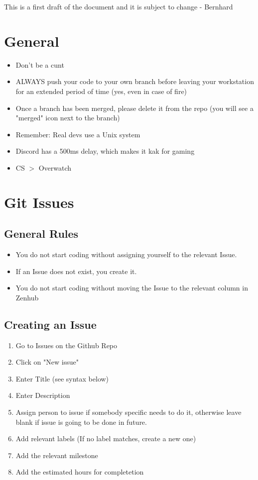 \documentclass{article}
\begin{document}
\newpage
\tableofcontents
\newpage
	
	This is a first draft of the document and it is subject to change - Bernhard
	\section{General}
		\begin{itemize}
			\item Don't be a cunt
			\item ALWAYS push your code to your own branch before leaving your workstation for an extended period of time (yes, even in case of fire)
			\item Once a branch has been merged, please delete it from the repo (you will see a "merged" icon next to the branch)
			\item Remember: Real devs use a Unix system
			\item Discord has a 500ms delay, which makes it kak for gaming
			\item CS $>$ Overwatch
		\end{itemize}
		
	\section{Git Issues}
		\subsection{General Rules}
			\begin{itemize}
				\item You do not start coding without assigning yourself to the relevant Issue.
				\item If an Issue does not exist, you create it.
				\item You do not start coding without moving the Issue to the relevant column in Zenhub
			\end{itemize}
			
		\subsection{Creating an Issue}
			\begin{enumerate}
				\item Go to Issues on the Github Repo
				\item Click on "New issue"
				\item Enter Title (see syntax below)
				\item Enter Description
				\item Assign person to issue if somebody specific needs to do it, otherwise leave blank if issue is going to be done in future.
				\item Add relevant labels (If no label matches, create a new one)
				\item Add the relevant milestone
				\item Add the estimated hours for completetion
			\end{enumerate}
\end{document}
